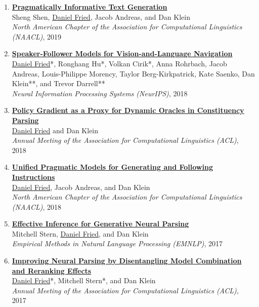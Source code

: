 \begin{enumerate}[leftmargin=-1mm,partopsep=0pt]
  \item \href{http://nlp.cs.berkeley.edu/pubs/Shen-Fried-Andreas-Klein_2019_PragmaticGeneration_paper.pdf}{\textbf{Pragmatically Informative Text Generation}} \\
    Sheng Shen, \underline{Daniel Fried}, Jacob Andreas, and Dan Klein \\
    \emph{North American Chapter of the Association for Computational Linguistics (NAACL)}, 2019

  \item \href{https://arxiv.org/abs/1806.02724}{\textbf{Speaker-Follower Models for Vision-and-Language Navigation}} \\
    \underline{Daniel Fried}*, Ronghang Hu*, Volkan Cirik*, Anna Rohrbach, Jacob Andreas, 
    Louis-Philippe Morency, Taylor Berg-Kirkpatrick, Kate Saenko, Dan Klein**, and Trevor Darrell**  \\
    \emph{Neural Information Processing Systems (NeurIPS)}, 2018

  \item \href{https://arxiv.org/abs/1806.03290}{\textbf{Policy Gradient as a Proxy for Dynamic Oracles in Constituency Parsing}}\\
    \underline{Daniel Fried} and Dan Klein \\
    \emph{Annual Meeting of the Association for Computational Linguistics (ACL)}, 2018

  \item \href{https://arxiv.org/abs/1711.04987}{\textbf{Unified Pragmatic Models for Generating and Following Instructions}}\\
    \underline{Daniel Fried}, Jacob Andreas, and Dan Klein \\
    \emph{North American Chapter of the Association for Computational Linguistics (NAACL)}, 2018


  \item \href{http://arxiv.org/abs/1707.08976}{\textbf{Effective Inference for Generative Neural Parsing}}\\
    Mitchell Stern, \underline{Daniel Fried}, and Dan Klein \\
    \emph{Empirical Methods in Natural Language Processing (EMNLP)}, 2017

  \item \href{https://arxiv.org/abs/1707.03058}{\textbf{Improving Neural Parsing by Disentangling Model Combination and Reranking Effects}}\\
    \underline{Daniel Fried}*, Mitchell Stern*, and Dan Klein\\
    \emph{Annual Meeting of the Association for Computational Linguistics (ACL)}, 2017


\end{enumerate}
